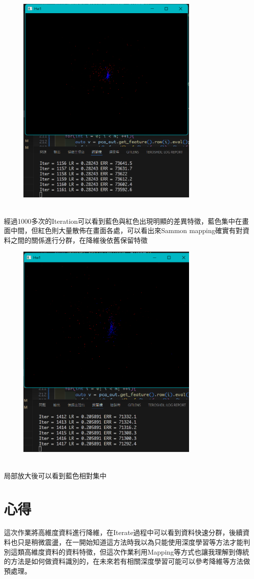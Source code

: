 \documentclass[a4paper,12pt]{article}
\begin{document}
\begin{figure}[H]
    \centering
    \includegraphics[width=0.8\textwidth]{img/img0.png}
\end{figure}\\
經過1000多次的Iteration可以看到藍色與紅色出現明顯的差異特徵，藍色集中在畫面中間，但紅色則大量散佈在畫面各處，可以看出來Sammon mapping確實有對資料之間的關係進行分群，在降維後依舊保留特徵

\begin{figure}[H]
    \centering
    \includegraphics[width=0.8\textwidth]{img/img1.png}
\end{figure}\\
局部放大後可以看到藍色相對集中



\section{心得}
    這次作業將高維度資料進行降維，在Iterate過程中可以看到資料快速分群，後續資料也只是稍微震盪，在一開始知道這方法時我以為只能使用深度學習等方法才能判別這類高維度資料的資料特徵，但這次作業利用Mapping等方式也讓我理解到傳統的方法是如何做資料識別的，在未來若有相關深度學習可能可以參考降維等方法做預處理。
\end{document}
